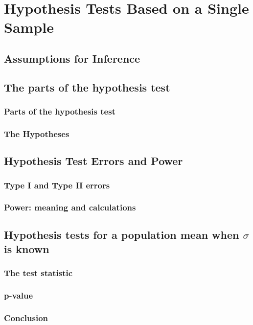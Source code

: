 \chapter{Hypothesis Tests Based on a Single Sample}  %

\section{Assumptions for Inference}  %

\section{The parts of the hypothesis test}  %
\subsection{Parts of the hypothesis test}  %
\subsection{The Hypotheses}  %

\section{Hypothesis Test Errors and Power}  %
\subsection{Type I and Type II errors}  %
\subsection{Power: meaning and calculations}  %

\section{Hypothesis tests for a population mean when $\sigma$ is known}  %
\subsection{The test statistic}  %
\subsection{p-value}  %
\subsection{Conclusion}  %
